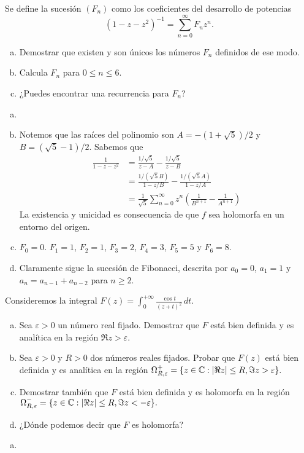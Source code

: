 \documentclass[twoside]{article}
\begin{document}
\newpage
\begin{ejercicio}{2}
Se define la sucesión $(F_n)$ como los coeficientes del desarrollo de potencias 
\[(1-z-z^2)^{-1}=\sum_{n=0}^\infty F_n z^n.\]
\begin{enumerate}[a)]
\item Demostrar que existen y son únicos los números $F_n$ definidos de ese modo.
\item Calcula $F_n$ para $0\le n\le 6$. 
\item ¿Puedes encontrar una recurrencia para $F_n$?
\end{enumerate}
\end{ejercicio}
\begin{solucion}
\begin{enumerate}[a)]
\item[]
\item Notemos que las raíces del polinomio son $A= -(1+\sqrt{5})/2$ y $B=(\sqrt{5}-1)/2$. Sabemos que
\begin{align*}
\frac{1}{1-z-z^2} &= \frac{1/\sqrt{5}}{z-A}-\frac{1/\sqrt{5}}{z-B}\\
&= \frac{1/(\sqrt{5}B)}{1-z/B} - \frac{1/(\sqrt{5}A)}{1-z/A}\\
& = 
\frac{1}{\sqrt{5}}\sum_{n=0}^\infty z^n\left(\frac{1}{B^{n+1}}-\frac{1}{A^{n+1}}\right)
\end{align*}
La existencia y unicidad es consecuencia de que $f$ sea holomorfa en un entorno del origen.
\item $F_0 = 0$. $F_1 = 1$, $F_2 = 1$, $F_3 = 2$, $F_4=3$, $F_5=5$ y $F_6 = 8$.
\item Claramente sigue la sucesión de Fibonacci, descrita por $a_0 =0$, $a_1=1$ y $a_n = a_{n-1}+a_{n-2}$ para $n\geq 2$.
\end{enumerate}
\end{solucion}

\newpage
\begin{ejercicio}{3}
Consideremos la integral 
$\displaystyle{F(z)=\int_0^{+\infty}\frac{\cos t}{(z+t)^2}\,dt}$.
\begin{enumerate}[a)]
\item Sea $\varepsilon>0$ un número real fijado. Demostrar que $F$  está bien definida y es analítica en la región $\Re z>\varepsilon$.
\item Sea $\varepsilon>0$ y $R>0$ dos números reales fijados. Probar que $F(z)$ está bien definida y es analítica en la región $\Omega^+_{R,\varepsilon}=\{z\in\mathbb{C}: |\Re z|\le R, \Im z>\varepsilon\}.$
\item Demostrar también que $F$ está bien definida y es holomorfa en la región\newline 
$\Omega^-_{R,\varepsilon}=\{z\in\mathbb{C}: |\Re z|\le R, \Im z<-\varepsilon\}.$
\item ¿Dónde podemos decir que $F$ es holomorfa?
\end{enumerate}
\end{ejercicio}
\begin{solucion}
\begin{enumerate}[a)]
\item[]
\end{enumerate}
\end{solucion}
\end{document}
